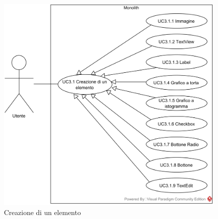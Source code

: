 \begin{samepage}
\nopagebreak
\begin{figure}[H]
	\centering
	\includegraphics[width=15cm]{../../documenti/AnalisiDeiRequisiti/Diagrammi_img/usecase/creazione_elem.png}
	\caption{\UCFCaption{} Creazione di un elemento}
\end{figure}
\end{samepage}

